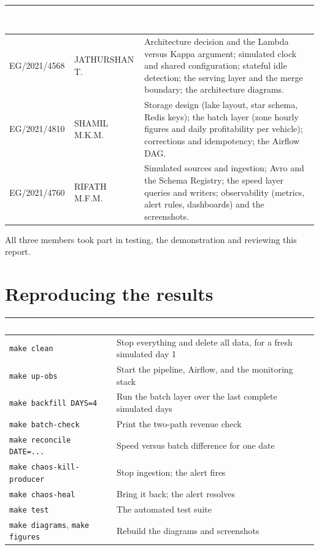 \documentclass[11pt,a4paper]{article}
\newcommand{\hd}[1]{\textcolor{white}{\textbf{#1}}}
\begin{document}
\begin{table}[H]\centering\small
\begin{tabularx}{\linewidth}{|l|l|X|}
\hline
\rowcolor{tablehead}\hd{Index number} & \hd{Member} & \hd{Major parts} \\ \hline
EG/2021/4568 & JATHURSHAN T. & Architecture decision and the Lambda versus Kappa argument; simulated
clock and shared configuration; stateful idle detection; the serving layer and the
merge boundary; the architecture diagrams. \\ \hline
EG/2021/4810 & SHAMIL M.K.M. & Storage design (lake layout, star schema, Redis keys); the batch layer (zone
hourly figures and daily profitability per vehicle); corrections and idempotency; the
Airflow DAG. \\ \hline
EG/2021/4760 & RIFATH M.F.M. & Simulated sources and ingestion; Avro and the Schema Registry; the speed layer
queries and writers; observability (metrics, alert rules, dashboards) and the
screenshots. \\ \hline
\end{tabularx}
\end{table}

All three members took part in testing, the demonstration and reviewing this report.

\section{Reproducing the results}

\begin{table}[H]\centering\small
\begin{tabularx}{\linewidth}{|l|X|}
\hline
\rowcolor{tablehead}\hd{Command} & \hd{What it does} \\ \hline
\texttt{make clean} & Stop everything and delete all data, for a fresh simulated day 1 \\ \hline
\texttt{make up-obs} & Start the pipeline, Airflow, and the monitoring stack \\ \hline
\texttt{make backfill DAYS=4} & Run the batch layer over the last complete simulated days \\ \hline
\texttt{make batch-check} & Print the two-path revenue check \\ \hline
\texttt{make reconcile DATE=...} & Speed versus batch difference for one date \\ \hline
\texttt{make chaos-kill-producer} & Stop ingestion; the alert fires \\ \hline
\texttt{make chaos-heal} & Bring it back; the alert resolves \\ \hline
\texttt{make test} & The automated test suite \\ \hline
\texttt{make diagrams}, \texttt{make figures} & Rebuild the diagrams and screenshots \\ \hline
\end{tabularx}
\end{table}
\end{document}
